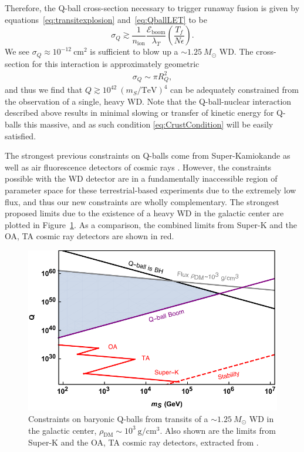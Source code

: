 \documentclass[twocolumn, preprintnumbers,amsmath,amssymb,prd, superscriptaddress]{revtex4}
\newcommand{\Eboom}{\mathcal{E}_\text{boom}}
\def\r{\right)}
\def\l{\left(}
\begin{document}
Therefore, the Q-ball cross-section necessary to trigger runaway fusion is given by equations~\eqref{eq:transitexplosion} and~\eqref{eq:QballLET} to be
\begin{equation}
\sigma_Q \gtrsim \frac{1}{n_\text{ion}} \frac{\Eboom}{\lambda_T} \l \frac{T_f}{N \epsilon} \r.
\end{equation}
We see $\sigma_Q \approx 10^{-12} ~\text{cm}^2$ is sufficient to blow up a $\sim 1.25 ~M_{\odot}$ WD.
The cross-section for this interaction is approximately geometric
\begin{align}
\sigma_Q \sim \pi R_Q^2,
\end{align}
and thus we find that $Q \gtrsim 10^{42} ~(m_S/\text{TeV})^4$ can be adequately constrained from the observation of a single, heavy WD.
Note that the Q-ball-nuclear interaction described above results in minimal slowing or transfer of kinetic energy for Q-balls this massive, and as such condition \eqref{eq:CrustCondition} will be easily satisfied.

The strongest previous constraints on Q-balls come from Super-Kamiokande as well as air fluorescence detectors of cosmic rays \cite{Dine:2003ax}.
However, the constraints possible with the WD detector are in a fundamentally inaccessible region of parameter space for these terrestrial-based experiments due to the extremely low flux, and thus our new constraints are wholly complementary.
The strongest proposed limits due to the existence of a heavy WD in the galactic center are plotted in Figure~\ref{fig:Qballconstraint}. As a comparison, the combined limits from Super-K and the OA, TA cosmic ray detectors are shown in red.
\begin{figure}
\includegraphics[scale=.55]{Qballconstraint.pdf}
\caption{Constraints on baryonic Q-balls from transits of a $\sim 1.25 ~M_{\odot}$ WD in the galactic center, $\rho_\text{DM} \sim 10^3 ~\text{g}/\text{cm}^3$. Also shown are the limits from Super-K and the OA, TA cosmic ray detectors, extracted from \cite{Dine:2003ax}.}
\label{fig:Qballconstraint}
\end{figure}
\end{document}
